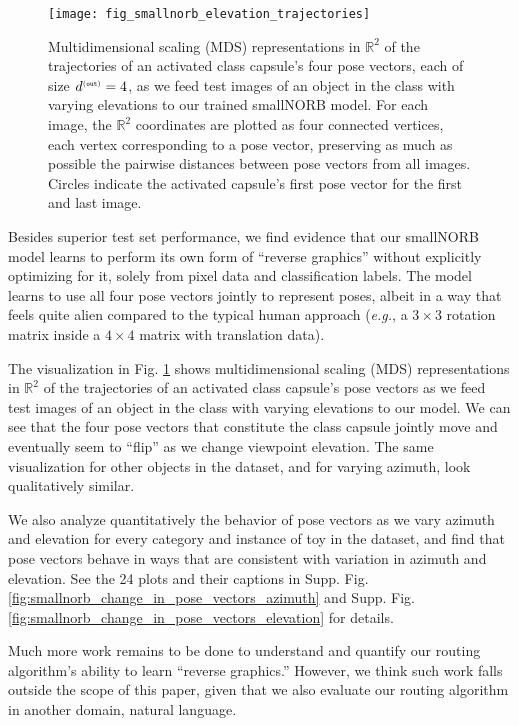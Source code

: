 \documentclass[11pt,a4paper]{article}
\begin{document}
\begin{figure}[h]
	\vskip 0.1in
	\begin{center}
		\centerline{\texttt{[image: fig\_smallnorb\_elevation\_trajectories]}}
		\caption{Multidimensional scaling (MDS) representations in $\mathbb{R}^2$ of the trajectories of an activated class capsule's four pose vectors, each of size $d^{{\scriptscriptstyle\tt (out)}} = 4$, as we feed test images of an object in the class with varying elevations to our trained smallNORB model. For each image, the $\mathbb{R}^2$ coordinates are plotted as four connected vertices, each vertex corresponding to a pose vector, preserving as much as possible the pairwise distances between pose vectors from all images. Circles indicate the activated capsule's first pose vector for the first and last image.}
		\label{fig:smallnorb_elevation_trajectories}
	\end{center}
	\vskip -0.2in
\end{figure}

Besides superior test set performance, we find evidence that our smallNORB model learns to perform its own form of ``reverse graphics'' without explicitly optimizing for it, solely from pixel data and classification labels. The model learns to use all four pose vectors jointly to represent poses, albeit in a way that feels quite alien compared to the typical human approach ({\em e.g.}, a $3 \times 3$ rotation matrix inside a $4 \times 4$ matrix with translation data).

The visualization in Fig. \ref{fig:smallnorb_elevation_trajectories} shows multidimensional scaling (MDS) representations in $\mathbb{R}^2$ of the trajectories of an activated class capsule's pose vectors as we feed test images of an object in the class with varying elevations to our model. We can see that the four pose vectors that constitute the class capsule jointly move and eventually seem to ``flip'' as we change viewpoint elevation. The same visualization for other objects in the dataset, and for varying azimuth, look qualitatively similar.

We also analyze quantitatively the behavior of pose vectors as we vary azimuth and elevation for every category and instance of toy in the dataset, and find that pose vectors behave in ways that are consistent with variation in azimuth and elevation. See the 24 plots and their captions in Supp. Fig. \ref{fig:smallnorb_change_in_pose_vectors_azimuth} and Supp. Fig. \ref{fig:smallnorb_change_in_pose_vectors_elevation} for details.

Much more work remains to be done to understand and quantify our routing algorithm's ability to learn ``reverse graphics.'' However, we think such work falls outside the scope of this paper, given that we also evaluate our routing algorithm in another domain, natural language.
\end{document}
